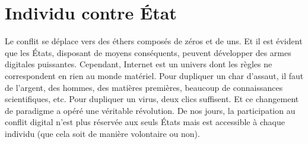 \documentclass[article, french]{yReport}
\begin{document}
	
	\section{Individu contre État}
	Le conflit se déplace vers des éthers composés de zéros et de uns. Et il est évident que les États, disposant de moyens conséquents, peuvent développer des armes digitales puissantes. Cependant, Internet est un univers dont les règles ne correspondent en rien au monde matériel. Pour dupliquer un char d'assaut, il faut de l'argent, des hommes, des matières premières, beaucoup de connaissances scientifiques, etc. Pour dupliquer un virus, deux clics suffisent. Et ce changement de paradigme a opéré une véritable révolution. De nos jours, la participation au conflit digital n'est plus réservée aux seuls États mais est accessible à chaque individu (que cela soit de manière volontaire ou non).
	
\end{document}
